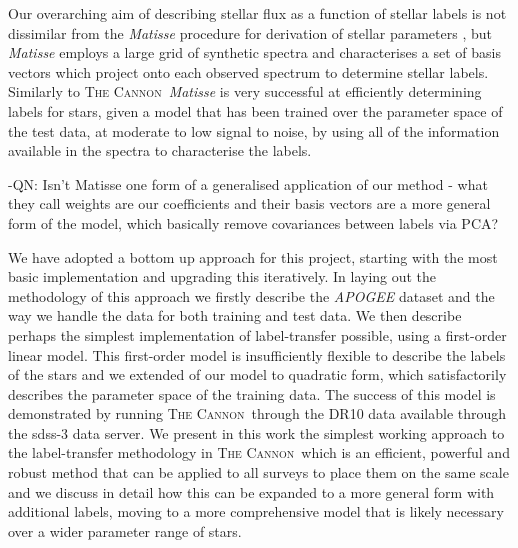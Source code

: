 \documentclass[12pt, preprint]{aastex}
\newcommand{\tc}{\textsc{The Cannon}}
\begin{document}
Our overarching aim of describing stellar flux as a function of stellar labels is not dissimilar from the \textit{Matisse} procedure for derivation of stellar parameters \citep{Reico-Blanco2006}, but \textit{Matisse} employs a large grid of synthetic spectra and characterises a set of basis vectors which project onto each observed spectrum to determine stellar labels. Similarly to \tc\, \textit{Matisse} is very successful at efficiently determining labels for stars, given a model that has been trained over the parameter space of the test data, at moderate to low signal to noise, by using all of the information available in the spectra to characterise the labels. 

-QN: Isn't Matisse one form of a generalised application of our method - what they call weights are our coefficients and their basis vectors are a more general form of the model, which basically remove covariances between labels via PCA? 

We have adopted a bottom up approach for this project, starting with the most basic implementation and upgrading this iteratively.  In laying out the methodology of this approach we firstly describe the \textit{APOGEE} dataset and the way we handle the data for both training and test data. We then describe perhaps the simplest implementation of label-transfer possible, using a first-order linear model. This first-order model is insufficiently flexible to describe the labels of the stars and we extended of our model to quadratic form, which satisfactorily describes the parameter space of the training data. The success of this model is demonstrated by running \tc\ through the DR10 data available through the sdss-3 data server. We present in this work the simplest working approach to the label-transfer methodology in \tc\, which is an efficient, powerful and robust method that can be applied to all surveys to place them on the same scale and we discuss in detail how this can be expanded to a more general form with additional labels, moving to a more comprehensive model that is likely necessary over a wider parameter range of stars. 

\end{document}

